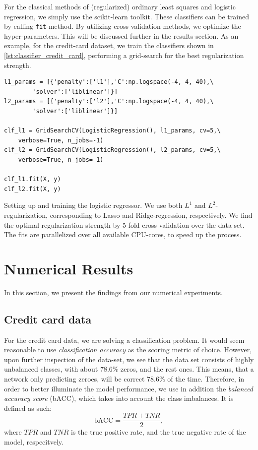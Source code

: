 \documentclass[a4paper, 11pt, oneside, article]{memoir}
\begin{document}
	For the classical methods of (regularized) ordinary least squares and
	logistic regression, we simply use the scikit-learn toolkit. These
	classifiers can be trained by calling \texttt{fit}-method. By utilizing
	cross validation methods, we optimize the hyper-parameters. This will
	be discussed further in the results-section. As an example, for the
	credit-card dataset, we train the classifiers shown in
	\cref{lst:classifier_credit_card}, performing a grid-search for the
	best regularization strength.
	\begin{listing}
	\begin{verbatim}
l1_params = [{'penalty':['l1'],'C':np.logspace(-4, 4, 40),\
		'solver':['liblinear']}]
l2_params = [{'penalty':['l2'],'C':np.logspace(-4, 4, 40),\
		'solver':['liblinear']}]

clf_l1 = GridSearchCV(LogisticRegression(), l1_params, cv=5,\
	verbose=True, n_jobs=-1)
clf_l2 = GridSearchCV(LogisticRegression(), l2_params, cv=5,\
	verbose=True, n_jobs=-1)

clf_l1.fit(X, y)
clf_l2.fit(X, y)
	\end{verbatim}
	\caption{Setting up and training the logistic regressor. We use both
	\(L^1\) and \( L^2\)-regularization, corresponding to Lasso and
Ridge-regression, respectively. We find the optimal regularization-strength by
5-fold cross validation over the data-set. The fits are parallelized over all
available CPU-cores, to speed up the process.}
	\label{lst:classifier_credit_card}
	\end{listing}

	\section{Numerical Results}
	
	In this section, we present the findings from our numerical
	experiments.
		
	\subsection{Credit card data}

	For the credit card data, we are solving a classification problem. It
	would seem reasonable to use \emph{classification accuracy} as the
	scoring metric of choice. However, upon further inspection of the
	data-set, we see that the data set consists of highly unbalanced
	classes, with about 78.6\% zeros, and the rest ones. This means, that a
	network only predicting zeroes, will be correct 78.6\% of the time.
	Therefore, in order to better illuminate the model performance, we use
	in addition the \emph{balanced accuracy score} (bACC), which takes into
	account the class imbalances. It is defined as such:
	\begin{equation}
		\mathrm{bACC} = \frac{TPR + TNR}{2},
	\end{equation}
	where \( TPR \) and \( TNR \) is the true positive rate, and the
	true negative rate of the model, respecitvely.
\end{document}

